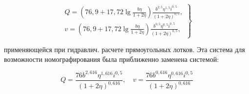\documentclass[10pt]{article}
\begin{document}
\[

\left.\begin{array}{l}

Q=\left(76,9+17,72 \lg \frac{b \eta}{1+2 \eta}\right) \frac{b^{2,5} \eta^{1,5} i^{0,5}}{(1+2 \eta)^{0,5}}, \\

v=\left(76,9+17,72 \lg \frac{b \eta}{1+2 \eta}\right) \frac{b^{0,5} \eta^{0,5} i^{0,5}}{(1+2 \eta)^{0,5}},

\end{array}\right\}

\]



применяющейся при гидравлич. расчете прямоугольных лотков. Эта система для возможности номографирования была приближенно заменена системой:



\[

Q=\frac{76 b^{2,616} \eta^{1,616} i^{0,5}}{(1+2 \eta)^{0,616}}, \quad v=\frac{76 b^{0,616} \eta^{0,616} i^{0,5}}{(1+2 \eta)^{0,616}}

\]
\end{document}
